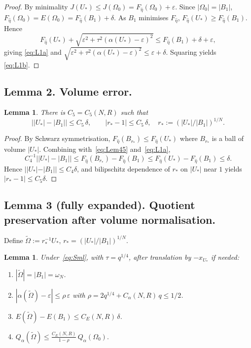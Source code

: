 \documentclass[11pt]{article}
\newtheorem{lemma}[theorem]{Lemma}
\theoremstyle{definition}
\newcommand{\eps}{\varepsilon}
\newcommand{\wt}{\widetilde}
\newcommand{\Om}{\Omega}
\begin{document}
\begin{proof}
By minimality $J(U_*)\le J(\Om_0)=F_{\hat\eta}(\Om_0)+\eps$. Since
$|\Om_0|=|B_1|$, $F_{\hat\eta}(\Om_0)=E(\Om_0)=F_{\hat\eta}(B_1)+\delta$.
As $B_1$ minimises $F_{\hat\eta}$, $F_{\hat\eta}(U_*)\ge F_{\hat\eta}(B_1)$.
Hence
\[
F_{\hat\eta}(U_*)+\sqrt{\eps^2+\tau^2(\alpha(U_*)-\eps)^2}
\le F_{\hat\eta}(B_1)+\delta+\eps,
\]
giving \eqref{eq:L1a} and
$\sqrt{\eps^2+\tau^2(\alpha(U_*)-\eps)^2}\le\eps+\delta$. Squaring yields
\eqref{eq:L1b}.
\end{proof}

\subsection*{Lemma 2. Volume error.}

\begin{lemma}\label{lem:2}
There is $C_5=C_5(N,R)$ such that
\[
\bigl||U_*|-|B_1|\bigr|\le C_5\,\delta,\qquad
|r_*-1|\le C_5\,\delta,\quad r_*:=(|U_*|/|B_1|)^{1/N}.
\]
\end{lemma}

\begin{proof}
By Schwarz symmetrisation, $F_{\hat\eta}(B_{r_*})\le F_{\hat\eta}(U_*)$
where $B_{r_*}$ is a ball of volume $|U_*|$. Combining with~\eqref{eq:Lem45}
and~\eqref{eq:L1a},
\[
C_4^{-1}\bigl||U_*|-|B_1|\bigr|\le F_{\hat\eta}(B_{r_*})-F_{\hat\eta}(B_1)
\le F_{\hat\eta}(U_*)-F_{\hat\eta}(B_1)\le\delta.
\]
Hence $||U_*|-|B_1||\le C_4\delta$, and bilipschitz dependence of $r_*$
on $|U_*|$ near $1$ yields $|r_*-1|\le C_5\delta$.
\end{proof}

\subsection*{Lemma 3 (fully expanded). Quotient preservation after volume normalisation.}

Define $\wt\Om:=r_*^{-1}U_*$, $r_*=(|U_*|/|B_1|)^{1/N}$.

\begin{lemma}\label{lem:3}
Under~\eqref{eq:Sml}, with $\tau=q^{1/4}$, after translation by $-x_{U_*}$
if needed:
\begin{enumerate}
\item[\rm(a)] $|\wt\Om|=|B_1|=\omega_N$.
\item[\rm(b)] $|\alpha(\wt\Om)-\eps|\le\rho\,\eps$ with
$\rho=2q^{1/4}+C_\alpha(N,R)\,q\le1/2$.
\item[\rm(c)] $E(\wt\Om)-E(B_1)\le C_E(N,R)\,\delta$.
\item[\rm(d)] $\displaystyle Q_\alpha(\wt\Om)\le\frac{C_E(N,R)}{1-\rho}\,Q_\alpha(\Om_0).$
\end{enumerate}
\end{lemma}
\end{document}
